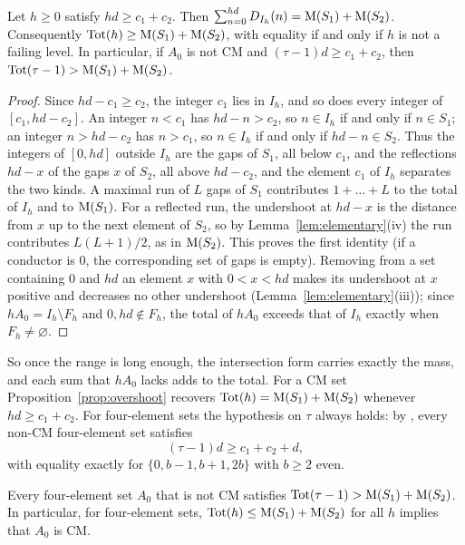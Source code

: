 \begin{proposition}[Overshoot]\label{prop:overshoot}
Let $h\ge0$ satisfy $hd\ge c_1+c_2$. Then $\sum_{n=0}^{hd}D_{I_h}(n)=\operatorname{M}(S_1)+\operatorname{M}(S_2)$. Consequently $\operatorname{Tot}(h)\ge\operatorname{M}(S_1)+\operatorname{M}(S_2)$, with equality if and only if $h$ is not a failing level. In particular, if $A_0$ is not CM and $(\tau-1)d\ge c_1+c_2$, then $\operatorname{Tot}(\tau-1)>\operatorname{M}(S_1)+\operatorname{M}(S_2)$.
\end{proposition}

\begin{proof}
Since $hd-c_1\ge c_2$, the integer $c_1$ lies in $I_h$, and so does every integer of $[c_1,hd-c_2]$. An integer $n<c_1$ has $hd-n>c_2$, so $n\in I_h$ if and only if $n\in S_1$; an integer $n>hd-c_2$ has $n>c_1$, so $n\in I_h$ if and only if $hd-n\in S_2$. Thus the integers of $[0,hd]$ outside $I_h$ are the gaps of $S_1$, all below $c_1$, and the reflections $hd-x$ of the gaps $x$ of $S_2$, all above $hd-c_2$, and the element $c_1$ of $I_h$ separates the two kinds. A maximal run of $L$ gaps of $S_1$ contributes $1+\dots+L$ to the total of $I_h$ and to $\operatorname{M}(S_1)$. For a reflected run, the undershoot at $hd-x$ is the distance from $x$ up to the next element of $S_2$, so by Lemma~\ref{lem:elementary}(iv) the run contributes $L(L+1)/2$, as in $\operatorname{M}(S_2)$. This proves the first identity (if a conductor is $0$, the corresponding set of gaps is empty). Removing from a set containing $0$ and $hd$ an element $x$ with $0<x<hd$ makes its undershoot at $x$ positive and decreases no other undershoot (Lemma~\ref{lem:elementary}(iii)); since $hA_0=I_h\setminus F_h$ and $0,hd\notin F_h$, the total of $hA_0$ exceeds that of $I_h$ exactly when $F_h\neq\varnothing$.
\end{proof}

So once the range is long enough, the intersection form carries exactly the mass, and each sum that $hA_0$ lacks adds to the total. For a CM set Proposition~\ref{prop:overshoot} recovers $\operatorname{Tot}(h)=\operatorname{M}(S_1)+\operatorname{M}(S_2)$ whenever $hd\ge c_1+c_2$. For four-element sets the hypothesis on $\tau$ always holds: by \cite[Theorem~A]{CompanionRegularity}, every non-CM four-element set satisfies
\[
(\tau-1)d\ge c_1+c_2+d ,
\]
with equality exactly for $\{0,b-1,b+1,2b\}$ with $b\ge2$ even.

\begin{corollary}\label{cor:four-overshoot}
Every four-element set $A_0$ that is not CM satisfies $\operatorname{Tot}(\tau-1)>\operatorname{M}(S_1)+\operatorname{M}(S_2)$. In particular, for four-element sets, $\operatorname{Tot}(h)\le\operatorname{M}(S_1)+\operatorname{M}(S_2)$ for all $h$ implies that $A_0$ is CM.
\end{corollary}

